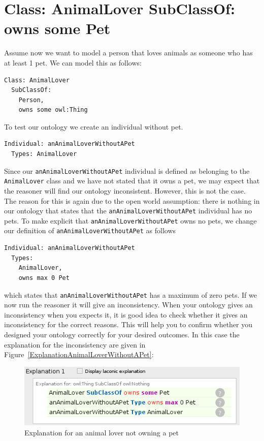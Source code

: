\documentclass{amsart}
\begin{document}
  \section{Class: AnimalLover SubClassOf: owns some Pet}
  Assume now we want to model a person that loves animals as someone who has at least 1 pet. We can model this as follows:
\begin{small}
\begin{verbatim} 
Class: AnimalLover
  SubClassOf: 
    Person,
    owns some owl:Thing
\end{verbatim}
\end{small}  
To test our ontology we create an individual without pet.
\begin{small}
\begin{verbatim} 
Individual: anAnimalLoverWithoutAPet
  Types: AnimalLover
\end{verbatim}
\end{small} 
Since our \texttt{anAnimalLoverWithoutAPet} individual is defined as belonging to the \texttt{AnimalLover} class and we have not stated that it owns a pet, we may expect that the reasoner will find our ontology inconsistent. However, this is not the case. The reason for this is again due to the open world assumption: there is nothing in our ontology that states that the \texttt{anAnimalLoverWithoutAPet} individual has no pets. To make explicit that \texttt{anAnimalLoverWithoutAPet} owns no pets, we change our definition of \texttt{anAnimalLoverWithoutAPet} as follows
\begin{small}
\begin{verbatim} 
Individual: anAnimalLoverWithoutAPet
  Types: 
    AnimalLover, 
    owns max 0 Pet
\end{verbatim}
\end{small} 
which states that \texttt{anAnimalLoverWithoutAPet} has a maximum of zero pets. If we now run the reasoner it will give an inconsistency. When your ontology gives an inconsistency when you expects it, it is good idea to check whether it gives an inconsistency for the correct reasons. This will help you to confirm whether you designed your ontology correctly for your desired outcomes. In this case the explanation for the inconsistency are given in Figure~\ref{ExplanationAnimalLoverWithoutAPet}:
    \begin{figure}
      \centering \includegraphics[trim = 0mm 0mm 0mm 0mm, clip, scale=0.6]{./ExplanationAnimalLoverWithoutAPet.png}
      \caption{Explanation for an animal lover not owning a pet}\label{fig_ExplanationAnimalLoverWithoutAPet}
    \end{figure} 
\end{document}
